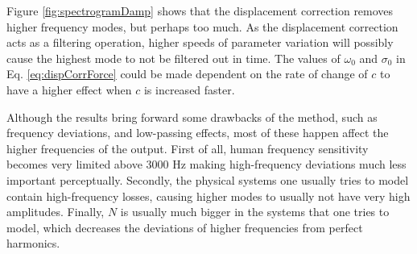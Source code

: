 Figure \ref{fig:spectrogramDamp} shows that the displacement correction removes higher frequency modes, but perhaps too much. As the displacement correction acts as a filtering operation, higher speeds of parameter variation will possibly cause the highest mode to not be filtered out in time. The values of $\omega_0$ and $\sigma_0$ in Eq. \eqref{eq:dispCorrForce} could be made dependent on the rate of change of $c$ to have a higher effect when $c$ is increased faster.

Although the results bring forward some drawbacks of the method, such as frequency deviations, and low-passing effects, most of these happen affect the higher frequencies of the output. First of all, human frequency sensitivity becomes very limited above 3000 Hz \cite{Zwicker1990} making high-frequency deviations much less important perceptually. Secondly, the physical systems one usually tries to model contain high-frequency losses, causing higher modes to usually not have very high amplitudes. Finally, $N$ is usually much bigger in the systems that one tries to model, which decreases the deviations of higher frequencies from perfect harmonics. 

